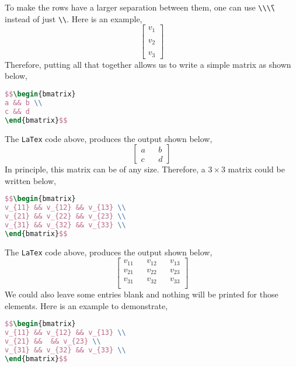 \documentclass[a4paper, 12pt]{report}
\begin{document}
\begin{center}
To make the rows have a larger separation between them, one can use \texttt{\textbackslash \textbackslash \~ \textbackslash \textbackslash} instead of just \texttt{\textbackslash \textbackslash}. Here is an example,
$$\begin{bmatrix}
v_{1} \\~\\ v_{2} \\~\\ v_{3}
\end{bmatrix}$$
Therefore, putting all that together allows us to write a simple matrix as shown below,
\begin{lstlisting}[language=tex]
$$\begin{bmatrix}
a && b \\
c && d
\end{bmatrix}$$
\end{lstlisting}
The \texttt{LaTex} code above, produces the output shown below,
$$\begin{bmatrix}
a && b \\
c && d
\end{bmatrix}$$
In principle, this matrix can be of any size. Therefore, a $3\times 3$ matrix could be written below,
\begin{lstlisting}[language=tex]
$$\begin{bmatrix}
v_{11} && v_{12} && v_{13} \\ 
v_{21} && v_{22} && v_{23} \\ 
v_{31} && v_{32} && v_{33} \\ 
\end{bmatrix}$$
\end{lstlisting}
The \texttt{LaTex} code above, produces the output shown below,
$$\begin{bmatrix}
v_{11} && v_{12} && v_{13} \\ 
v_{21} && v_{22} && v_{23} \\ 
v_{31} && v_{32} && v_{33} \\ 
\end{bmatrix}$$
We could also leave some entries blank and nothing will be printed for those elements. Here is an example to demonstrate,
\begin{lstlisting}[language=tex]
$$\begin{bmatrix}
v_{11} && v_{12} && v_{13} \\ 
v_{21} &&  && v_{23} \\ 
v_{31} && v_{32} && v_{33} \\ 
\end{bmatrix}$$

\end{lstlisting}
\end{center}
\end{document}

